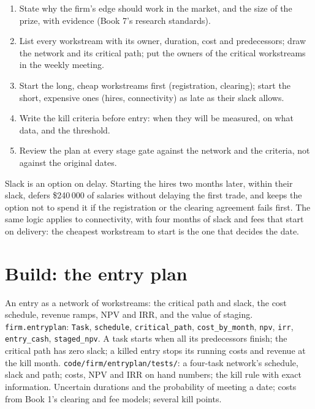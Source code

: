 \begin{method}\label{met:fm:entering-a-new-market:plan}
\begin{enumerate}
\item State why the firm's edge should work in the market, and the size of the prize, with evidence (Book 7's research standards).
\item List every workstream with its owner, duration, cost and predecessors; draw the network and its critical path; put the owners of the critical
workstreams in the weekly meeting.
\item Start the long, cheap workstreams first (registration, clearing); start the short, expensive ones (hires, connectivity) as late as their slack
allows.
\item Write the kill criteria before entry: when they will be measured, on what data, and the threshold.
\item Review the plan at every stage gate against the network and the criteria, not against the original dates.
\end{enumerate}
\end{method}

\begin{remark}\label{rem:fm:entering-a-new-market:slack}
Slack is an option on delay. Starting the hires two months later, within their slack, defers \$240\,000 of salaries without delaying the first
trade, and keeps the option not to spend it if the registration or the clearing agreement fails first. The same logic applies to connectivity,
with four months of slack and fees that start on delivery: the cheapest workstream to start is the one that decides the date.
\end{remark}

\section{Build: the entry plan}\label{bld:fm:entering-a-new-market:entryplan}

\begin{build}
 An entry as a network of workstreams: the critical path and slack, the cost schedule, revenue ramps, NPV and IRR, and the value of
staging.
 \texttt{firm.entryplan}: \texttt{Task}, \texttt{schedule}, \texttt{critical\_path}, \texttt{cost\_by\_month}, \texttt{npv},
\texttt{irr}, \texttt{entry\_cash}, \texttt{staged\_npv}.
 A task starts when all its predecessors finish; the critical path has zero slack; a killed entry stops its running costs and revenue
at the kill month.
 \texttt{code/firm/entryplan/tests/}: a four-task network's schedule, slack and path; costs, NPV and IRR on hand numbers;
the kill rule with exact information.
 Uncertain durations and the probability of meeting a date; costs from Book 1's clearing and fee models; several kill points.
\end{build}

